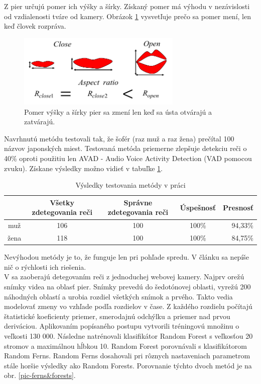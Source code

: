Z pier určujú pomer ich výšky a šírky.
Získaný pomer má výhodu v nezávislosti od vzdialenosti tváre od kamery.
Obrázok \ref{pic-pery} vysvetľuje prečo sa pomer mení, len keď človek rozpráva.

\begin{figure}[H]
	\begin{center}
		\includegraphics[height=3.5cm]{pics/pery.png}
		\caption{Pomer výšky a šírky pier sa zmení len keď sa ústa otvárajú a zatvárajú.
		 \cite{aoki2007voice}}
		\label{pic-pery}
	\end{center}
\end{figure}

Navrhnutú metódu testovali tak, že šofér (raz muž a raz žena) prečítal 100 názvov japonských miest.
Testovaná metóda priemerne zlepšuje detekciu reči o 40\% oproti použitiu len AVAD - Audio Voice Activity Detection (VAD pomocou zvuku).  
Získane výsledky možno vidieť v tabuľke \ref{tab-results}.

\begin{table}[H]
	\begin{center}
		\begin{tabular}{|c|c|c|c|r|}
			\hline
			& Všetky zdetegovania reči & Správne zdetegovania reči & Úspešnosť & Presnosť \\
			\hline
			muž & 106 & 100 & 100\% & 94,33\%\\
			\hline
			žena & 118 & 100 & 100\% & 84,75\%\\
			\hline
		\end{tabular}
	\end{center}
	\caption{Výsledky testovania metódy v práci \cite{aoki2007voice}}
	\label{tab-results}
\end{table}

Nevýhodou metódy je to, že funguje len pri pohľade spredu. V článku sa nepíše nič o rýchlosti ich riešenia.\\

V \cite{vieriu2014real} sa zaoberajú detegovaním reči z jednoduchej webovej kamery. 
Najprv orežú snímky videa na oblasť pier.
Snímky prevedú do šedotónovej oblasti, vyrežú 200 ná\-hod\-ných oblastí a urobia rozdiel všetkých snímok a prvého. 
Takto vedia modelovať zmeny vo vzhľade podľa rozdielov v čase.
Z každého rozdielu počítajú štatistické koeficienty priemer, smerodajnú odchýlku a priemer nad prvou deriváciou. 
Aplikovaním popísaného postupu vytvorili tréningovú množinu o veľkosti 130 000.
Následne natrénovali klasifikátor Random Forest s veľkosťou 20 stromov a maximálnou hĺbkou 10. 
Random Forest porovnávali s klasifikátorom Random Ferns. 
Random Ferns dosahovali pri rôznych nastaveniach parametrom stále horšie výsledky ako Random Forests.
Porovnanie týchto dvoch metód je na obr. \ref{pic-ferns&forests}.

